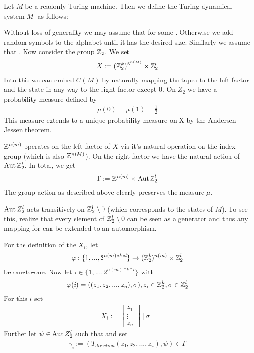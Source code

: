 
Let $M$ be a readonly Turing machine.
Then we define the Turing dynamical system $M^\prime$ as follows:

Without loss of generality we may assume that  for some .
Otherwise we add random symbols to the alphabet until it has the desired size.
Similarly we assume that .
Now consider the group $\mathbb{Z}_2$.
We set
\begin{align*}
	X := {(\mathbb{Z}_2^{k})^{\mathbb{Z}^{n(M)}}} \times \mathbb{Z}_2^l
\end{align*}
Into this we can embed $C(M)$ by naturally mapping the tapes to the left factor and the state in any way to the right factor except $0$.
On $Z_2$ we have a probability measure defined by
\begin{align*}
	\mu(0) = \mu(1) = \frac12
\end{align*}
This measure extends to a unique probability measure on X by the Andersen-Jessen theorem. %


$\mathbb{Z}^{n(m)}$ operates on the left factor of $X$ via it's natural operation on the index group (which is also $\mathbb{Z}^{n(M)}$).
On the right factor we have the natural action of $\operatorname{Aut} \mathbb{Z}_2^l$.
In total, we get
\begin{align*}
	\Gamma := \mathbb{Z}^{n(m)} \times \operatorname{Aut} \mathbb{Z}_2^l
\end{align*}
The group action as described above clearly preserves the measure $\mu$.

$\operatorname{Aut} Z_2^l$ acts transitively on $\mathbb{Z}_2^l \setminus 0$ (which corresponds to the states of $M$).
To see this, realize that every element of $\mathbb{Z}_2^l \setminus 0$ can be seen as a generator and thus any mapping  for  can be extended to an automorphism.

For the definition of the $X_i$, let
\begin{align*}
	\varphi: \{1,...,2^{n(m) * k * l}\} \to (\mathbb{Z}_2^k)^{n(m)} \times \mathbb{Z}_2^l
\end{align*}
be one-to-one. Now let $i \in \{1,...,2^{n(m) * k * l}\}$ with
\begin{align*}
	\varphi(i) = ((z_1,z_2,...,z_n),\sigma), z_i \in \mathbb{Z}_2^k, \sigma \in \mathbb{Z}_2^l
\end{align*}
For this $i$ set
\begin{align*}
	X_i := \begin{bmatrix} z_1 \\ \vdots \\ z_n \end{bmatrix} \left [ \sigma \right ]
\end{align*}
Further let $\psi \in \operatorname{Aut} Z_2^l$ such that 
and set
\begin{align*}
	\gamma_i := (T_{direction}(z_1,z_2,...,z_n) , \psi) \in \Gamma
\end{align*}

